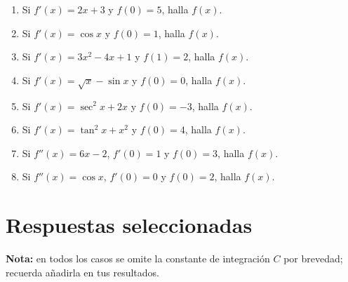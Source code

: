 \documentclass[12pt, letterpaper]{article}
\begin{document}
\begin{enumerate}[label=\textbf{\arabic*.}, leftmargin=*, itemsep=16pt, start=67]

  \item \facil\quad
    Si $f'(x) = 2x + 3$ y $f(0) = 5$, halla $f(x)$.

  \item \facil\quad
    Si $f'(x) = \cos x$ y $f(0) = 1$, halla $f(x)$.

  \item \medio\quad
    Si $f'(x) = 3x^2 - 4x + 1$ y $f(1) = 2$, halla $f(x)$.

  \item \medio\quad
    Si $f'(x) = \sqrt{x} - \sin x$ y $f(0) = 0$, halla $f(x)$.

  \item \medio\quad
    Si $f'(x) = \sec^2 x + 2x$ y $f(0) = -3$, halla $f(x)$.

  \item \dificil\quad
    Si $f'(x) = \tan^2 x + x^2$ y $f(0) = 4$, halla $f(x)$.

  \item \dificil\quad
    Si $f''(x) = 6x - 2$, $f'(0) = 1$ y $f(0) = 3$, halla $f(x)$.

  \item \dificil\quad
    Si $f''(x) = \cos x$, $f'(0) = 0$ y $f(0) = 2$, halla $f(x)$.

\end{enumerate}

\vspace{8pt}

\ifmwclaves
\section*{Respuestas seleccionadas}


\begin{cuadrosolucion}
\small
\textbf{Nota:} en todos los casos se omite la constante de integración $C$ por brevedad;
recuerda añadirla en tus resultados.
\end{cuadrosolucion}

\vspace{4pt}
\end{document}
